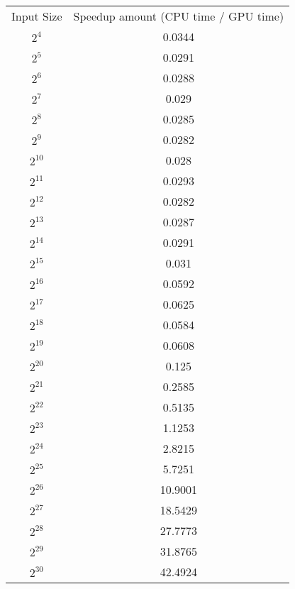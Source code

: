 \begin{center}
     \begin{tabular}{c | c}
         Input Size & Speedup amount (CPU time / GPU time) \\
$2^4$ & 0.0344 \\
$2^5$ & 0.0291 \\
$2^6$ & 0.0288 \\
$2^7$ & 0.029 \\
$2^8$ & 0.0285 \\
$2^9$ & 0.0282 \\
$2^{10}$ & 0.028 \\
$2^{11}$ & 0.0293 \\
$2^{12}$ & 0.0282 \\
$2^{13}$ & 0.0287 \\
$2^{14}$ & 0.0291 \\
$2^{15}$ & 0.031 \\
$2^{16}$ & 0.0592 \\
$2^{17}$ & 0.0625 \\
$2^{18}$ & 0.0584 \\
$2^{19}$ & 0.0608 \\
$2^{20}$ & 0.125 \\
$2^{21}$ & 0.2585 \\
$2^{22}$ & 0.5135 \\
$2^{23}$ & 1.1253 \\
$2^{24}$ & 2.8215 \\
$2^{25}$ & 5.7251 \\
$2^{26}$ & 10.9001 \\
$2^{27}$ & 18.5429 \\
$2^{28}$ & 27.7773 \\
$2^{29}$ & 31.8765 \\
$2^{30}$ & 42.4924 
    \end{tabular}

\begin{landscape}
    \small\newpage
    

\end{landscape}
\end{center}
